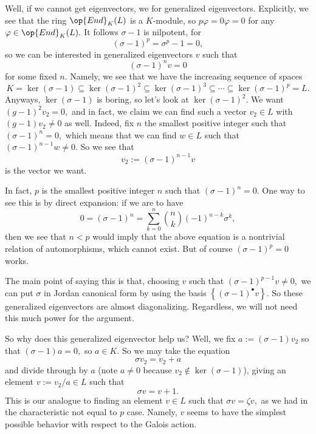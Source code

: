 \documentclass[../notes.tex]{subfiles}
\begin{document}
Well, if we cannot get eigenvectors, we for generalized eigenvectors. Explicitly, we see that the ring $\op{End}_K(L)$ is a $K$-module, so $p\varphi=0\varphi=0$ for any $\varphi\in\op{End}_K(L).$ It follows $\sigma-1$ is nilpotent, for
\[(\sigma-1)^p=\sigma^p-1=0,\]
so we can be interested in generalized eigenvectors $v$ such that
\[(\sigma-1)^nv=0\]
for some fixed $n.$ Namely, we see that we have the increasing sequence of spaces
\[K=\ker(\sigma-1)\subseteq\ker(\sigma-1)^2\subseteq\ker(\sigma-1)^3\subseteq\cdots\subseteq\ker(\sigma-1)^p=L.\]
Anyways, $\ker(\sigma-1)$ is boring, so let's look at $\ker(\sigma-1)^2.$ We want $(g-1)^2v_2=0,$ and in fact, we claim we can find such a vector $v_2\in L$ with $(g-1)v_2\ne0$ as well. Indeed, fix $n$ the smallest positive integer such that $(\sigma-1)^n=0,$ which means that we can find $w\in L$ such that $(\sigma-1)^{n-1}w\ne0.$ So we see that
\[v_2:=(\sigma-1)^{n-1}v\]
is the vector we want.
\begin{remark}[Nir]
	In fact, $p$ is the smallest positive integer $n$ such that $(\sigma-1)^n=0.$ One way to see this is by direct expansion: if we are to have
	\[0=(\sigma-1)^n=\sum_{k=0}^n\binom nk(-1)^{n-k}\sigma^k,\]
	then we see that $n<p$ would imply that the above equation is a nontrivial relation of automorphisms, which cannot exist. But of course $(\sigma-1)^p=0$ works.
	
	The main point of saying this is that, choosing $v$ such that $(\sigma-1)^{p-1}v\ne0,$ we can put $\sigma$ in Jordan canonical form by using the basis $\left\{(\sigma-1)^\bullet v\right\}.$ So these generalized eigenvectors are almost diagonalizing. Regardless, we will not need this much power for the argument.
\end{remark}
So why does this generalized eigenvector help us? Well, we fix $a:=(\sigma-1)v_2$ so that $(\sigma-1)a=0,$ so $a\in K.$ So we may take the equation
\[\sigma v_2=v_2+a\]
and divide through by $a$ (note $a\ne0$ because $v_2\notin\ker(\sigma-1)$), giving an element $v:=v_2/a\in L$ such that
\[\sigma v=v+1.\]
This is our analogue to finding an element $v\in L$ such that $\sigma v=\zeta v,$ as we had in the characteristic not equal to $p$ case. Namely, $v$ seems to have the simplest possible behavior with respect to the Galois action.
\end{document}
